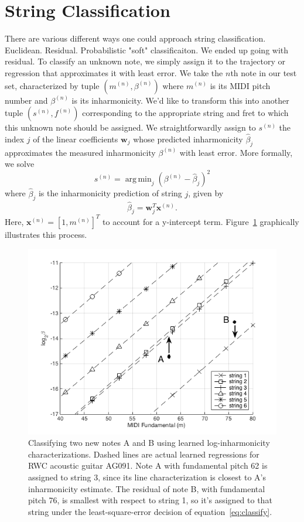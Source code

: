 \documentclass[12pt]{cmuthesis}
\DeclareMathOperator*{\argmin}{arg\,min}
\begin{document}
\section{String Classification}
There are various different ways one could approach string classification. 
Euclidean.
Residual.
Probabilistic "soft" classificaiton.
We ended up going with residual.
To classify an unknown note, we simply assign it to the trajectory or regression that approximates it with least error. We take the $n$th note in our test set, characterized by tuple $(m^{(n)},\beta^{(n)})$ where $m^{(n)}$ is its MIDI pitch number and $\beta^{(n)}$ is its inharmonicity. We'd like to transform this into another tuple $(s^{(n)},f^{(n)})$ corresponding to the appropriate string and fret to which this unknown note should be assigned. We straightforwardly assign to $s^{(n)}$ the index $j$ of the linear coefficients $\mathbf{w}_j$ whose predicted inharmonicity $\hat\beta_j$ approximates the measured inharmonicity $\beta^{(n)}$ with least error. More formally, we solve 
\begin{equation}
\label{eq:classify}
s^{(n)} = \argmin_{j}{(\beta^{(n)} - \hat{\beta}_{j})^2}
\end{equation}
where $\hat\beta_j$ is the inharmonicity prediction of string $j$, given by
\begin{equation}
\hat{\beta}_{j} = \mathbf{w}_{j}^T\mathbf{x}^{(n)}.
\end{equation}
Here, $\mathbf{x}^{(n)} = [1, m^{(n)}]^T$ to account for a y-intercept term. Figure~\ref{fig:classify} graphically illustrates this process.

\begin{figure}[!htbp] 
\label{fig:classify}
\centering
\includegraphics[scale=0.75]{classify}
\caption{Classifying two new notes A and B using learned log-inharmonicity characterizations. Dashed lines are actual learned regressions for RWC acoustic guitar AG091. Note A with fundamental pitch 62 is assigned to string 3, since its line characterization is closest to A's inharmonicity estimate. The residual of note B, with fundamental pitch 76, is smallest with respect to string 1, so it's assigned to that string under the least-square-error decision of equation~\eqref{eq:classify}.}
\end{figure}
\end{document}
